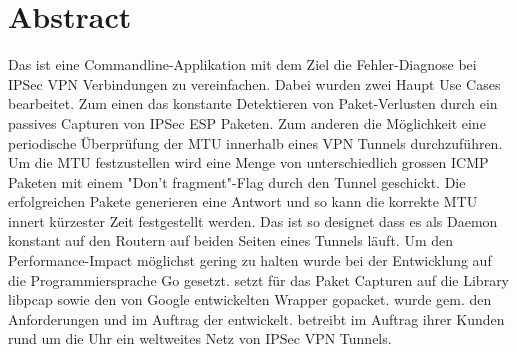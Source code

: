 
\chapter*{Abstract}

Das \tool ist eine Commandline-Applikation mit dem Ziel die Fehler-Diagnose bei IPSec VPN Verbindungen zu vereinfachen. Dabei wurden zwei Haupt Use Cases bearbeitet. Zum einen das konstante Detektieren von Paket-Verlusten durch ein passives Capturen von IPSec ESP Paketen. Zum anderen die Möglichkeit eine periodische Überprüfung der MTU innerhalb eines VPN Tunnels durchzuführen. Um die MTU festzustellen wird eine Menge von unterschiedlich grossen ICMP Paketen mit einem "Don't fragment"-Flag durch den Tunnel geschickt. Die erfolgreichen Pakete generieren eine Antwort und so kann die korrekte MTU innert kürzester Zeit festgestellt werden. Das \tool ist so designet dass es als Daemon konstant auf den Routern auf beiden Seiten eines Tunnels läuft. Um den Performance-Impact möglichst gering zu halten wurde bei der Entwicklung auf die Programmiersprache Go gesetzt. \tool setzt für das Paket Capturen auf die Library libpcap sowie den von Google entwickelten Wrapper gopacket. \tool wurde gem. den Anforderungen und im Auftrag der \osag entwickelt. \osag betreibt im Auftrag ihrer Kunden rund um die Uhr ein weltweites Netz von IPSec VPN Tunnels.